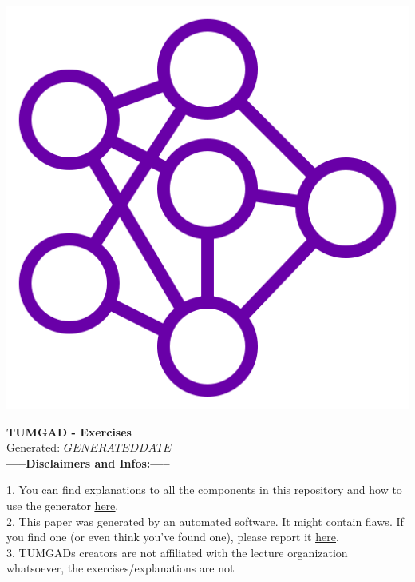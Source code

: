 \documentclass[12pt]{article}
\begin{document}
    \begin{center}
        \includegraphics[scale=0.25]{favicon.png} %
        \vspace{15px}

        {\selectfont
            \textbf{\LARGE{TUMGAD - Exercises}}\\
            Generated: $GENERATEDDATE$\\
        }
        \vspace{20px}
        \textbf{\LARGE{-----Disclaimers and Infos:-----}}
        \\[0.2in]
    \end{center}
    1. You can find explanations to all the components in this repository and how to use the generator \href{https://sebastianoner.github.io/TUMGAD/src/routes}{\underline{here}}.
    \\[0.2in]
    2. This paper was generated by an automated software.
    It might contain flaws.
    If you find one (or even think you've found one), please report it \href{https://github.com/SebastianOner/TUMGAD/issues/new?assignees=&labels=&template=bug_report.md&title=}{\underline{here}}.
    \\[0.2in]
    3. TUMGADs creators are not affiliated with the lecture organization whatsoever, the exercises/explanations are not
\end{document}
